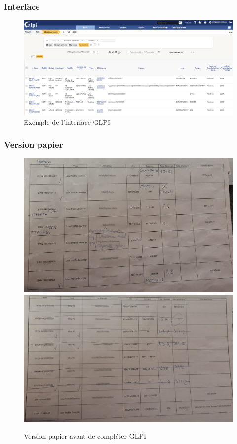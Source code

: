 \documentclass{article}
\begin{document}
        \subsubsection{Interface}
            \label{Gpli_ex}
            \begin{figure}[!h]
                \centering
                \includegraphics[scale = 0.32]{Images/GLPI.png}
                \caption{Exemple de l'interface GLPI}
            \end{figure} 
        \pagebreak
        \subsubsection{Version papier}
            \label{Gpli_papier}
            \begin{figure}[!h]
                \centering
                \includegraphics[angle = 90, scale = 0.17]{Images/Inventaire.jpg}\\
                \includegraphics[scale = 0.127]{Images/InventaireRaye.jpg}
                \caption{Version papier avant de compléter GLPI}
            \end{figure}
\end{document}
